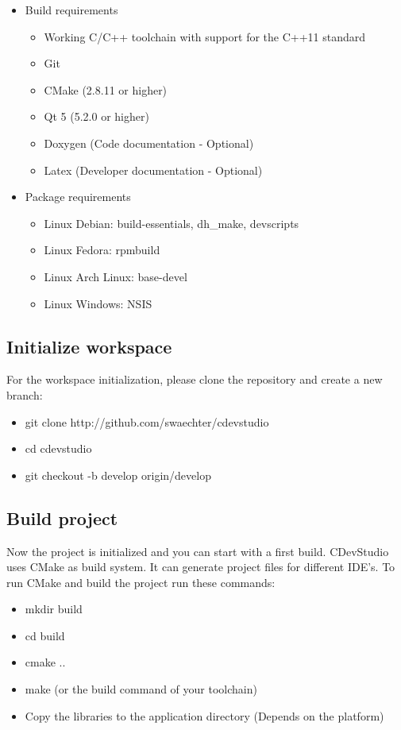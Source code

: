 \documentclass{article}
\begin{document}
\begin{itemize}
	\item Build requirements
	\begin{itemize}
		\item Working C/C++ toolchain with support for the C++11 standard
		\item Git
		\item CMake (2.8.11 or higher)
		\item Qt 5 (5.2.0 or higher)
		\item Doxygen (Code documentation - Optional)
		\item Latex (Developer documentation - Optional)
	\end{itemize}
	\item Package requirements
	\begin{itemize}
		\item Linux Debian: build-essentials, dh_make, devscripts
		\item Linux Fedora: rpmbuild
		\item Linux Arch Linux: base-devel
		\item Linux Windows: NSIS
	\end{itemize}
\end{itemize}

\subsection{Initialize workspace}
For the workspace initialization, please clone the repository and create a new branch:

\begin{itemize}
	\item git clone http://github.com/swaechter/cdevstudio
	\item cd cdevstudio
	\item git checkout -b develop origin/develop
\end{itemize}

\subsection{Build project}
Now the project is initialized and you can start with a first build. CDevStudio uses CMake as build system. It can generate project files for different IDE's. To run CMake and build the project run these commands:

\begin{itemize}
	\item mkdir build
	\item cd build
	\item cmake ..
	\item make (or the build command of your toolchain)
	\item Copy the libraries to the application directory (Depends on the platform)
\end{itemize}
\end{document}
